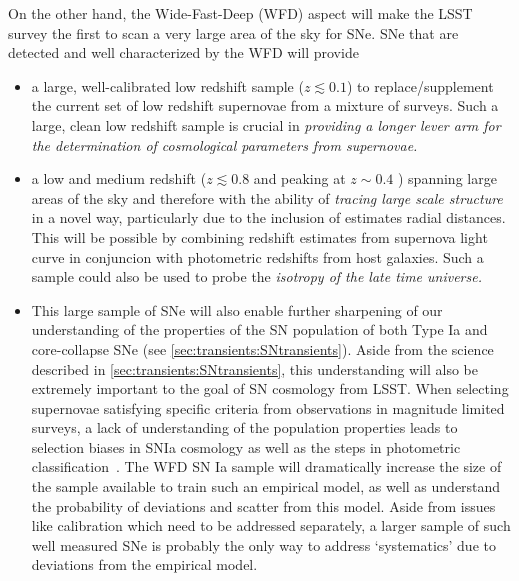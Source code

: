 On the other hand, the Wide-Fast-Deep (WFD) aspect will make the LSST survey
the first to scan a very large area of the sky for SNe. SNe that are detected
and well characterized by the WFD will provide 
\begin{itemize}
    \item a large, well-calibrated low redshift sample ($z \lesssim 0.1$) to replace/supplement the current  set of low redshift supernovae from a mixture of surveys. Such a large, clean low redshift sample is crucial in {\emph{providing a longer lever arm for the determination of cosmological parameters from supernovae.}}
    \item  a low and medium redshift ($z \lesssim 0.8$ and peaking at $z \sim 0.4$ ) spanning large areas of the sky and therefore with the ability of {\emph{tracing large scale structure}} in a novel way, particularly due to the inclusion of estimates radial distances. This will be possible by combining redshift estimates from supernova light curve in conjuncion with photometric redshifts from host galaxies.  Such a sample could also be used to probe the {\emph{isotropy of the late time universe.}}
    \item This large sample of SNe will also enable further sharpening of our understanding of the properties of the SN population of both Type Ia and core-collapse SNe (see \autoref{sec:transients:SNtransients}). Aside from the science described in \autoref{sec:transients:SNtransients}, this understanding will also be extremely important to the goal of SN cosmology from LSST. When selecting supernovae satisfying specific criteria from observations in magnitude limited surveys, a lack of understanding of the population properties leads to selection biases in SNIa cosmology as well as the steps in photometric classification~\cite{2017ApJ...836...56K,2016ApJ...822L..35S}. 
The WFD SN Ia
sample will dramatically increase the size of the sample available to
train such an empirical model, as well as understand the probability of
deviations and scatter from this model. Aside from issues like
calibration which need to be addressed separately, a larger sample of
such well measured SNe is probably the only way to address `systematics'
due to deviations from the empirical model. 
\end{itemize}

